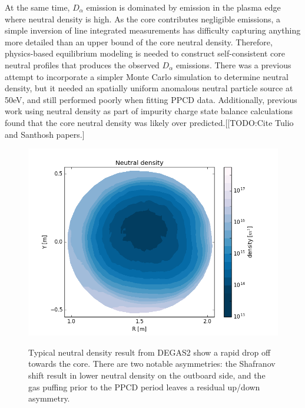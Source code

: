 \documentclass[aip, pop, preprint]{revtex4-1}
\begin{document}
At the same time, $D_{\alpha}$ emission is dominated by emission in
the plasma edge where neutral density is high. As the core contributes
negligible emissions, a simple inversion of line integrated measurements has
difficulty capturing anything more detailed than an upper bound of the core neutral density.
Therefore, physics-based equilibrium modeling is needed to construct self-consistent core neutral profiles that produces the observed $D_{\alpha}$ emissions. There was a previous attempt to incorporate a simpler Monte Carlo simulation to determine neutral density, but it needed an spatially uniform anomalous neutral particle source at 50eV, and still performed poorly when fitting PPCD data. Additionally, previous work using neutral density as part of impurity charge state balance calculations found that the core neutral density was likely over predicted.[[TODO:Cite Tulio and Santhosh papers.]

\begin{figure}
	\centering
	\includegraphics[width = 1.\linewidth]{./plots/degas_neutral_n}
	\label{fig:DEGAS2_2d_density}
	\caption{Typical neutral density result from DEGAS2 show a rapid drop off towards the core. There are two notable asymmetries: the Shafranov shift result in lower neutral density on the outboard side, and the gas puffing prior to the PPCD period leaves a residual up/down asymmetry.}
\end{figure}%
\end{document}
